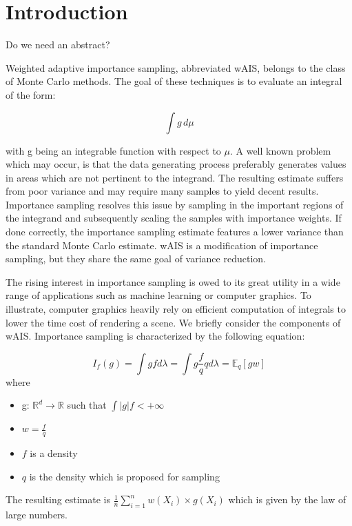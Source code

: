 \section{Introduction}

\begin{multicols}{2}
Do we need an abstract?


Weighted adaptive importance sampling, abbreviated wAIS, belongs to the class of Monte Carlo methods. The goal of these techniques is to evaluate an integral of the form: 

$$\displaystyle \int g \, d\mu$$

with g being an integrable function with respect to $\mu$. 
A well known problem which may occur, is that the data generating process preferably generates values in areas which are not pertinent to the integrand. The resulting estimate suffers from poor variance and may require many samples to yield decent results. Importance sampling resolves this issue by sampling in the important regions of the integrand and subsequently scaling the samples with importance weights. If done correctly, the importance sampling estimate features a lower variance than the standard Monte Carlo estimate. wAIS is a modification of importance sampling, but they share the same goal of variance reduction. 

The rising interest in importance sampling is owed to its great utility in a wide range of applications such as machine learning or computer graphics. To illustrate, computer graphics heavily rely on efficient computation of integrals to lower the time cost of rendering a scene. 
\newline
We briefly consider the components of wAIS.
Importance sampling is characterized by the following equation:




$$ I_f(g) = \displaystyle \int gf d\lambda = \int g \frac f q q d\lambda = \mathbb{E}_q [g w]
$$
where 
\begin{itemize}
    \item g: $\mathbb R^d \to \mathbb{R}$ such that $\int |g|f < +\infty$
    \item $w = \frac f q$
    \item $f$ is a density 
    \item $q$ is the density which is proposed for sampling
\end{itemize}

The resulting estimate is $\frac 1 n \displaystyle\sum\limits_{i=1}^n w(X_i) \times g(X_i)$
which is given by the law of large numbers.


\end{multicols}
